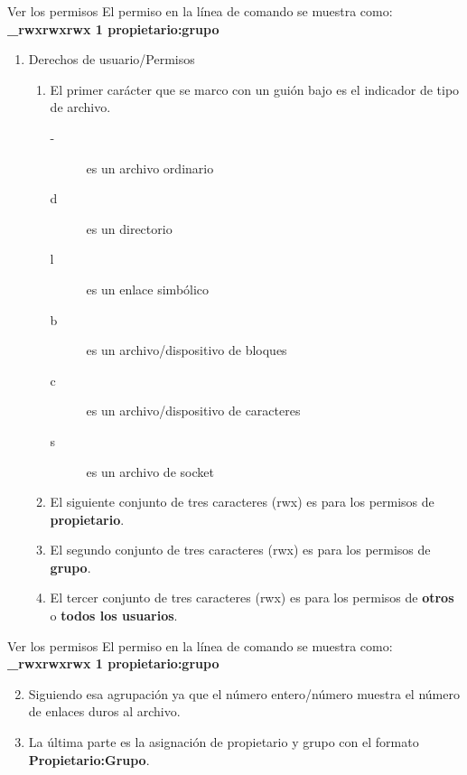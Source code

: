 \begin{frame}[c]{Ver los permisos}
  El permiso en la línea de comando se muestra como: \textbf{\_rwxrwxrwx 1
  propietario:grupo}

  \begin{enumerate}
    \item Derechos de usuario/Permisos
      \begin{enumerate}
        \item El primer carácter que se marco con un guión bajo es el indicador
          de tipo de archivo.
          \begin{description}
            \item [-] es un archivo ordinario
            \item [d] es un directorio
            \item [l] es un enlace simbólico
            \item [b] es un archivo/dispositivo de bloques
            \item [c] es un archivo/dispositivo de caracteres
            \item [s] es un archivo de socket
          \end{description}
        \item El siguiente conjunto de tres caracteres (rwx) es para los
          permisos de \textbf{propietario}.
        \item El segundo conjunto de tres caracteres (rwx) es para los
          permisos de \textbf{grupo}.
        \item El tercer conjunto de tres caracteres (rwx) es para los
          permisos de \textbf{otros} o \textbf{todos los usuarios}.
      \end{enumerate}
  \end{enumerate}
\end{frame}

\begin{frame}[c]{Ver los permisos}
  El permiso en la línea de comando se muestra como: \textbf{\_rwxrwxrwx 1
  propietario:grupo}

  \begin{enumerate}
    \setcounter{enumi}{1}
    \item Siguiendo esa agrupación ya que el número entero/número muestra el
      número de enlaces duros al archivo.
    \item La última parte es la asignación de propietario y grupo con el
      formato \textbf{Propietario:Grupo}.
  \end{enumerate}
\end{frame}

